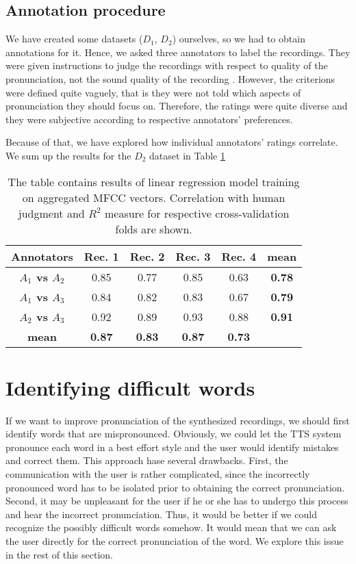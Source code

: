 \subsection{Annotation procedure}
We have created some datasets ($D_1$, $D_2$) ourselves, so we had to obtain annotations for it.
Hence, we asked three annotators to label the recordings.
They were given instructions to judge the recordings with respect to quality of the pronunciation, not the sound quality of the recording .
However, the criterions were defined quite vaguely, that is they were not told which aspects of pronunciation they should focus on.
Therefore, the ratings were quite diverse and they were subjective according to respective annotators' preferences.
\par
Because of that, we have explored how individual annotators' ratings correlate.
We sum up the results for the $D_2$ dataset in Table \ref{annotators}
\begin{table}
\begin{center}
\begin{tabular}{ |c|c|c|c|c|c| } 
 \hline
 \textbf{Annotators} & \textbf{Rec. 1} & \textbf{Rec. 2} & \textbf{Rec. 3} & \textbf{Rec. 4} & \textbf{mean} \\ \hline
\textbf{$A_1$ vs $A_2$} & 0.85 & 0.77 & 0.85 & 0.63 & \textbf{0.78} \\ \hline
\textbf{$A_1$ vs $A_3$} & 0.84 & 0.82 & 0.83 & 0.67 & \textbf{0.79} \\ \hline 
\textbf{$A_2$ vs $A_3$} & 0.92 & 0.89 & 0.93 & 0.88 & \textbf{0.91} \\ \hline 
\textbf{mean} & \textbf{0.87} & \textbf{0.83} & \textbf{0.87} & \textbf{0.73} &  \\ \hline 
 \end{tabular}
\end{center}
\label{annotators}
\caption{The table contains results of linear regression model training on aggregated MFCC vectors. Correlation with human judgment and $R^2$ measure for respective cross-validation folds are shown.}
\end{table}

\section{Identifying difficult words}
\label{ident-diff}
If we want to improve pronunciation of the synthesized recordings, we should first identify words that are mispronounced. Obviously, we could let the TTS system pronounce each word in a best effort style and  the user would identify mistakes and correct them. This approach hase several drawbacks. First, the communication with the user is rather complicated, since the incorrectly pronounced word has to be isolated prior to obtaining the correct pronunciation.
Second, it may be unpleasant for the user if he or she has to undergo this process and hear the incorrect pronunciation. Thus, it would be better if we could recognize the possibly difficult words somehow. It would mean that we can ask the user directly for the correct pronunciation of the word. We explore this issue in the rest of this section.
